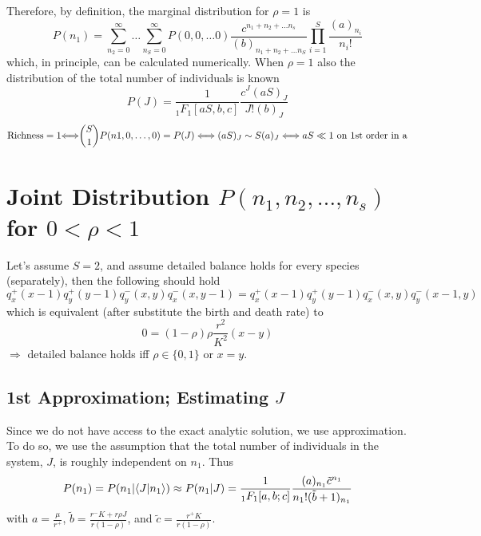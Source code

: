 \documentclass[%
 amsmath,amssymb,
 reprint,%
]{revtex4-2}
\begin{document}
\begin{widetext}
Therefore, by definition, the marginal distribution for $\rho=1$ is 
\begin{equation}
   P(n_1)=\sum_{n_2=0}^{\infty}\dots \sum_{n_S=0}^{\infty}P(0,0,\dots 0)\frac{c^{n_1+n_2+\dots n_s}}{(b)_{n_1+n_2+\dots n_S}}\prod_{i=1}^{S}\frac{(a)_{n_i}}{n_i!} 
\end{equation}
which, in principle, can be calculated numerically. 
When $\rho=1$ also the distribution of the total number of individuals is known
\begin{equation}
    P(J)=\frac{1}{{_1F_1[aS,b,c]}}\frac{c^J(a S)_{J}}{J!(b)_J}
\end{equation}
\begin{equation}
    {\rm Richness=1} {\Longleftrightarrow} \binom{S}{1}P(n1,0,\dots,0) = P(J) \Longleftrightarrow (aS)_J\sim S(a)_J \Longleftrightarrow aS \ll 1 {\rm \ on\ 1st\ order\ in\ a } 
 \end{equation}
     
\section{Joint Distribution $P(n_1,n_2,\dots, n_s)$ for $0<\rho<1$}

Let's assume $S=2$, and assume detailed balance holds for every species (separately), then the following should hold
\begin{equation}
    q_x^+(x-1)q_y^+(y-1)q_{y}^{-}(x,y)q_{x}^-(x,y-1)= q^+_{x}(x-1)q^+_{y}(y-1)q_x^{-}(x,y) q_{y}^- (x-1,y)
\end{equation}
which is equivalent (after substitute the birth and death rate) to 
\begin{equation}
    0=(1-\rho)\rho\frac{r^2}{K^2}(x-y)
\end{equation}
$\Longrightarrow$ detailed balance holds iff $\rho\in \{0, 1\}$ or $x=y$.

\subsection{1st Approximation; Estimating $J$}
Since we do not have access to the exact analytic solution, we use approximation. To do so, we use the assumption that the total number of individuals in the system, $J$, is roughly independent on $n_1$. Thus
\begin{equation} 
    P(n_1)=P(n_1|\langle J |n_1 \rangle ) \approx P(n_1|J)=\frac{1}{_1F_1[a,b;c]} 
    \frac{(a)_{n_1} \Tilde{c}^{n_1}}{n_1 ! (\Tilde{b}+1)_{n_1} } 
\end{equation}
with $a=\frac{\mu}{r^+}$, $\tilde{b}= \frac{r^-K+r\rho J}{r(1-\rho)}$, and $\tilde{c}=\frac{r^+ K}{r(1-\rho)}$.


\end{widetext}
\end{document}
